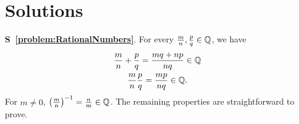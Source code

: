\chapter{Solutions}

\noindent
\textbf{S~\ref{problem:RationalNumbers}}.
For every $\frac{m}{n}, \frac{p}{q} \in \mathbb{Q}$, we have
\begin{gather*}
\frac{m}{n} + \frac{p}{q} = \frac{mq + np}{nq} \in \mathbb{Q} \\
\frac{m}{n} \frac{p}{q} = \frac{mp}{nq} \in \mathbb{Q} .
\end{gather*}
For $m \neq 0$, $\left( \frac{m}{n} \right)^{-1} = \frac{n}{m} \in \mathbb{Q}$.
The remaining properties are straightforward to prove.


